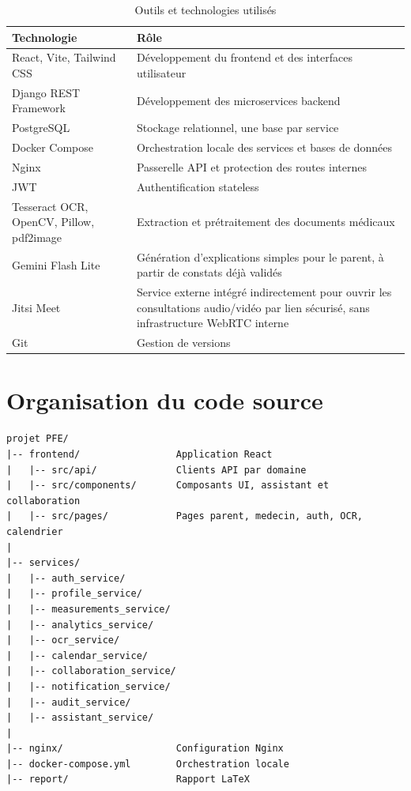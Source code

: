 \begin{table}[H]
\centering
\caption{Outils et technologies utilisés}
\label{tab:env-logiciel}
\begin{tabularx}{\textwidth}{|l|X|}
\hline
\textbf{Technologie} & \textbf{Rôle} \\
\hline
React, Vite, Tailwind CSS & Développement du frontend et des interfaces utilisateur \\
\hline
Django REST Framework & Développement des microservices backend \\
\hline
PostgreSQL & Stockage relationnel, une base par service \\
\hline
Docker Compose & Orchestration locale des services et bases de données \\
\hline
Nginx & Passerelle API et protection des routes internes \\
\hline
JWT & Authentification stateless \\
\hline
Tesseract OCR, OpenCV, Pillow, pdf2image & Extraction et prétraitement des documents médicaux \\
\hline
Gemini Flash Lite & Génération d'explications simples pour le parent, à partir de constats déjà validés \\
\hline
Jitsi Meet & Service externe intégré indirectement pour ouvrir les consultations audio/vidéo par lien sécurisé, sans infrastructure WebRTC interne \\
\hline
Git & Gestion de versions \\
\hline
\end{tabularx}
\end{table}

\section{Organisation du code source}
\label{sec:organisation-code}

\begin{verbatim}
projet PFE/
|-- frontend/                 Application React
|   |-- src/api/              Clients API par domaine
|   |-- src/components/       Composants UI, assistant et collaboration
|   |-- src/pages/            Pages parent, medecin, auth, OCR, calendrier
|
|-- services/
|   |-- auth_service/
|   |-- profile_service/
|   |-- measurements_service/
|   |-- analytics_service/
|   |-- ocr_service/
|   |-- calendar_service/
|   |-- collaboration_service/
|   |-- notification_service/
|   |-- audit_service/
|   |-- assistant_service/
|
|-- nginx/                    Configuration Nginx
|-- docker-compose.yml        Orchestration locale
|-- report/                   Rapport LaTeX
\end{verbatim}

